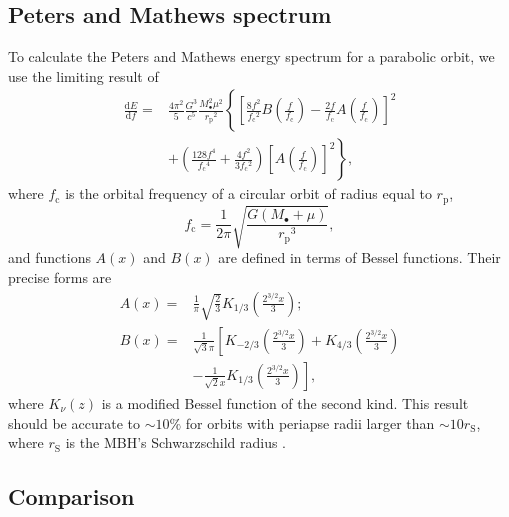 \documentclass[useAMS,usedcolumn,usegraphicx,usenatbib]{mn2e}
\newcommand{\sub}[1]{\ensuremath{_\mathrm{#1}}}
\newcommand{\dd}{\ensuremath{\mathrm{d}}}
\newcommand{\diff}[2]{\ensuremath{\frac{\dd {#1}}{\dd {#2}}}}
\newcommand{\recip}[1]{\ensuremath{\frac{1}{#1}}}
\begin{document}
\subsection{Peters and Mathews spectrum}

To calculate the Peters and Mathews energy spectrum for a parabolic orbit, we use the limiting result of \citet{Turner1977}
\begin{align}
\diff{E}{f} = {} & \frac{4\pi^2}{5}\frac{G^3}{c^5}\frac{M_\bullet^2\mu^2}{r\sub{p}^2}\left\{\left[\frac{8f^2}{f\sub{c}^2}B\left(\frac{f}{f\sub{c}}\right) - \frac{2f}{f\sub{c}}A\left(\frac{f}{f\sub{c}}\right)\right]^2 \right. \nonumber \\
 & \left. + \left(\frac{128f^4}{f\sub{c}^4} + \frac{4f^2}{3f\sub{c}^2}\right)\left[A\left(\frac{f}{f\sub{c}}\right)\right]^2\right\},
\label{eq:PM_dEdf}
\end{align}
where $f\sub{c}$ is the orbital frequency of a circular orbit of radius equal to $r\sub{p}$,
\begin{equation}
f\sub{c} = \recip{2\pi}\sqrt{\frac{G(M_\bullet + \mu)}{r\sub{p}^3}},
\end{equation}
and functions $A\left(x\right)$ and $B\left(x\right)$ are defined in terms of Bessel functions. Their precise forms are \citep{Berry2010}
\begin{align}
A\left(x\right) = {} & \recip{\pi}\sqrt{\frac{2}{3}}K_{1/3}\left(\frac{2^{3/2}x}{3}\right); \\
B\left(x\right) = {} & \recip{\sqrt{3}\pi}\left[K_{-2/3}\left(\frac{2^{3/2}x}{3}\right) + K_{4/3}\left(\frac{2^{3/2}x}{3}\right) \right. \nonumber \\
 {} & - \left. \recip{\sqrt{2}x}K_{1/3}\left(\frac{2^{3/2}x}{3}\right)\right],
\end{align}
where $K_\nu(z)$ is a modified Bessel function of the second kind. This result should be accurate to $\sim10\%$ for orbits with periapse radii larger than $\sim10r\sub{S}$, where $r\sub{S}$ is the MBH's Schwarzschild radius \citep{Berry2010}.

\subsection{Comparison}
\end{document}
